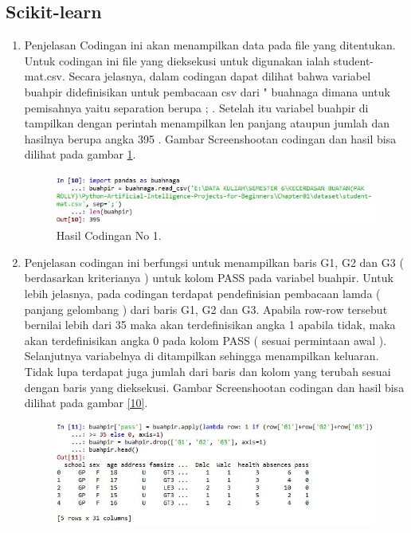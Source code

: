 \subsection{Scikit-learn}
\begin{enumerate}
\item Penjelasan Codingan ini akan menampilkan data pada file yang ditentukan. Untuk codingan ini file yang dieksekusi untuk digunakan ialah student-mat.csv. Secara jelasnya, dalam codingan dapat dilihat bahwa variabel buahpir didefinisikan untuk pembacaan csv dari " buahnaga  dimana untuk pemisahnya yaitu separation berupa ; . Setelah itu variabel buahpir di tampilkan dengan perintah menampilkan len panjang ataupun jumlah dan hasilnya berupa angka 395 . 
\subitem Gambar Screenshootan codingan dan hasil bisa dilihat pada gambar \ref{9}.
\begin{figure}[!htbp]
		\centerline{\includegraphics[width=1\textwidth]{figures/huda/1_hari4.JPG}}
		\caption{Hasil Codingan No 1.}
		\label{9}
\end{figure}
\item Penjelasan codingan ini berfungsi untuk menampilkan  baris  G1, G2 dan G3 ( berdasarkan kriterianya ) untuk kolom PASS pada variabel buahpir. Untuk lebih jelasnya, pada codingan terdapat pendefinisian pembacaan lamda ( panjang gelombang ) dari baris G1, G2 dan G3. Apabila row-row tersebut bernilai lebih dari 35 maka akan terdefinisikan angka 1 apabila tidak, maka akan terdefinisikan angka 0 pada kolom PASS ( sesuai permintaan awal ). Selanjutnya variabelnya di ditampilkan sehingga menampilkan keluaran. Tidak lupa terdapat juga jumlah dari baris dan kolom yang terubah sesuai dengan baris yang dieksekusi.
\subitem Gambar Screenshootan codingan dan hasil bisa dilihat pada gambar \ref{10}.
\begin{figure}[!htbp]
		\centerline{\includegraphics[width=1\textwidth]{figures/huda/2_hari4.JPG}}

\end{figure}
\end{enumerate}

